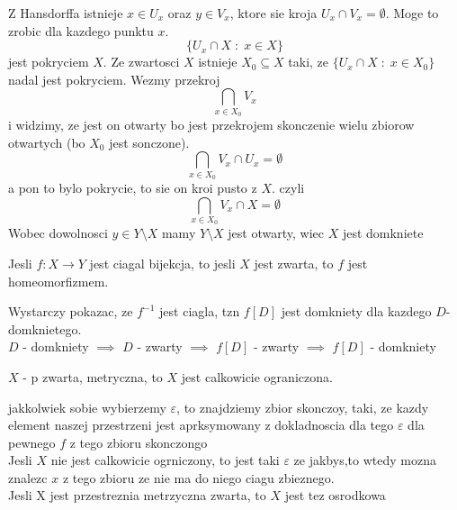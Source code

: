 \documentclass{article}
\begin{document}
Z Hansdorffa istnieje $x\in U_x$ oraz $y\in V_x$, ktore sie kroja $U_x\cap V_x=\emptyset$. Moge to zrobic dla kazdego punktu $x$.
$$\{U_x\cap X\;:\;x\in X\}$$
jest pokryciem $X$. Ze zwartosci $X$ istnieje $X_0\subseteq X$ taki, ze $\{U_x\cap X\;:\;x\in X_0\}$ nadal jest pokryciem. Wezmy przekroj
$$\bigcap\limits_{x\in X_0}V_x$$
i widzimy, ze jest on otwarty bo jest przekrojem skonczenie wielu zbiorow otwartych (bo $X_0$ jest sonczone).
$$\bigcap\limits_{x\in X_0}V_x\cap U_x=\emptyset$$
a pon to bylo pokrycie, to sie on kroi pusto z $X$.
czyli 
$$\bigcap\limits_{x\in X_0} V_x\cap X=\emptyset$$
Wobec dowolnosci $y\in Y\setminus X$ mamy $Y\setminus X$ jest otwarty, wiec $X$ jest domkniete
\kondow
\begin{center}
    Jesli $f:X\to Y$ jest ciagal bijekcja, to jesli $X$ jest zwarta, to $f$ jest homeomorfizmem.
\end{center}
\dowod
Wystarczy pokazac, ze $f^{-1}$ jest ciagla, tzn $f[D]$ jest domkniety dla kazdego $D$- domknietego.\\
$D$ - domkniety $\implies$ $D$ - zwarty $\implies$ $f[D]$ - zwarty $\implies$ $f[D]$ - domkniety
\kondow
\begin{center}
    $X$ - p zwarta, metryczna, to $X$ jest calkowicie ograniczona.
\end{center}
\dowod
jakkolwiek sobie wybierzemy $\varepsilon$, to znajdziemy zbior skonczoy, taki, ze kazdy element naszej przestrzeni jest aprksymowany z dokladnoscia dla tego $\varepsilon$ dla pewnego $f$ z tego zbioru skonczongo\\
Jesli $X$ nie jest calkowicie ogrniczony, to jest taki $\varepsilon$ ze jakbys,to wtedy mozna znalezc $x$ z tego zbioru ze nie ma do niego ciagu zbieznego.\bigskip\\
Jesli X jest przestreznia metrzyczna zwarta, to $X$ jest tez osrodkowa
\end{document}
